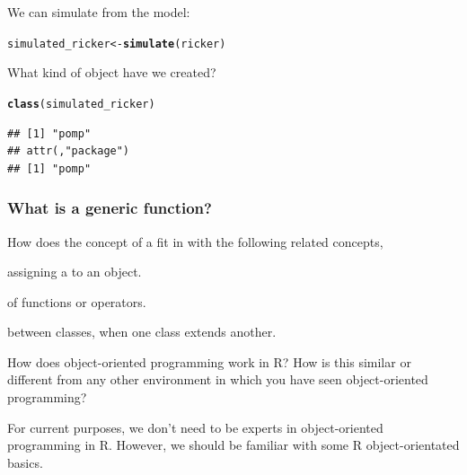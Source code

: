 \documentclass{beamer}\usepackage[]{graphicx}\usepackage[]{color}
\makeatletter
\newcommand{\hlstd}[1]{\textcolor[rgb]{0.345,0.345,0.345}{#1}}%
\newcommand{\hlkwb}[1]{\textcolor[rgb]{0.69,0.353,0.396}{#1}}%
\newcommand{\hlkwd}[1]{\textcolor[rgb]{0.737,0.353,0.396}{\textbf{#1}}}%
\newenvironment{kframe}{%
 \def\at@end@of@kframe{}%
 \ifinner\ifhmode%
  \def\at@end@of@kframe{\end{minipage}}%
  \begin{minipage}{\columnwidth}%
 \fi\fi%
 \def\FrameCommand##1{\hskip\@totalleftmargin \hskip-\fboxsep
 \colorbox{shadecolor}{##1}\hskip-\fboxsep
     \hskip-\linewidth \hskip-\@totalleftmargin \hskip\columnwidth}%
 \MakeFramed {\advance\hsize-\width
   \@totalleftmargin\z@ \linewidth\hsize
   \@setminipage}}%
 {\par\unskip\endMakeFramed%
 \at@end@of@kframe}
\newenvironment{knitrout}{}{} %
\makeatother
\begin{document}
\begin{frame}[fragile]
\bi

\item We can simulate from the model:
\ei

\begin{knitrout}\small
{}\color{fgcolor}\begin{kframe}
\begin{alltt}
\hlstd{simulated_ricker} \hlkwb{<-} \hlkwd{simulate}\hlstd{(ricker)}
\end{alltt}
\end{kframe}
\end{knitrout}

\bi

\item What kind of object have we created?
\ei
\begin{knitrout}\small
{}\color{fgcolor}\begin{kframe}
\begin{alltt}
\hlkwd{class}\hlstd{(simulated_ricker)}
\end{alltt}
\begin{verbatim}
## [1] "pomp"
## attr(,"package")
## [1] "pomp"
\end{verbatim}
\end{kframe}
\end{knitrout}


\end{frame}    

\begin{frame}[fragile]  

\frametitle{What is a generic function?}

\bi

\item How does the concept of a  fit in with the following related concepts,

\item {}

\item assigning a  to an object.

\item {} of functions or operators.

\item {} between classes, when one class extends another.

\item How does object-oriented programming work in R? How is this similar or different from any other environment in which you have seen object-oriented programming?

\item For current purposes, we don't need to be experts in object-oriented programming in R. However, we should be familiar with some R object-orientated basics.

\ei

\end{frame}
\end{document}

